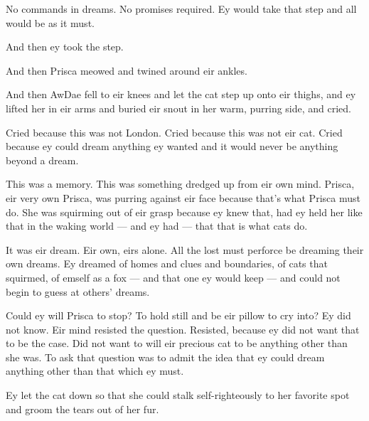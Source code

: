 No commands in dreams. No promises required. Ey would take that step and all would be as it must.

And then ey took the step.

And then Prisca meowed and twined around eir ankles.

And then AwDae fell to eir knees and let the cat step up onto eir thighs, and ey lifted her in eir arms and buried eir snout in her warm, purring side, and cried.

Cried because this was not London. Cried because this was not eir cat. Cried because ey could dream anything ey wanted and it would never be anything beyond a dream.

This was a memory. This was something dredged up from eir own mind. Prisca, eir very own Prisca, was purring against eir face because that's what Prisca must do. She was squirming out of eir grasp because ey knew that, had ey held her like that in the waking world — and ey had — that that is what cats do.

It was eir dream. Eir own, eirs alone. All the lost must perforce be dreaming their own dreams. Ey dreamed of homes and clues and boundaries, of cats that squirmed, of emself as a fox — and that one ey would keep — and could not begin to guess at others' dreams.

Could ey will Prisca to stop? To hold still and be eir pillow to cry into? Ey did not know. Eir mind resisted the question. Resisted, because ey did not want that to be the case. Did not want to will eir precious cat to be anything other than she was. To ask that question was to admit the idea that ey could dream anything other than that which ey must.

Ey let the cat down so that she could stalk self-righteously to her favorite spot and groom the tears out of her fur.
